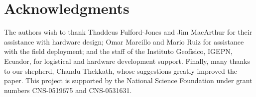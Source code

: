\section*{Acknowledgments}
\label{sec-acknowledgements}

The authors wish to thank Thaddeus Fulford-Jones and Jim MacArthur for
their assistance with hardware design; Omar Marcillo and Mario Ruiz
for assistance with the field deployment; and the staff of the 
Instituto Geof\'{i}sico, IGEPN, Ecuador, for logistical and hardware 
development support. Finally, many thanks to our shepherd, Chandu Thekkath, 
whose suggestions greatly improved the paper. 
This project is supported by the National Science Foundation under 
grant numbers CNS-0519675 and CNS-0531631.

